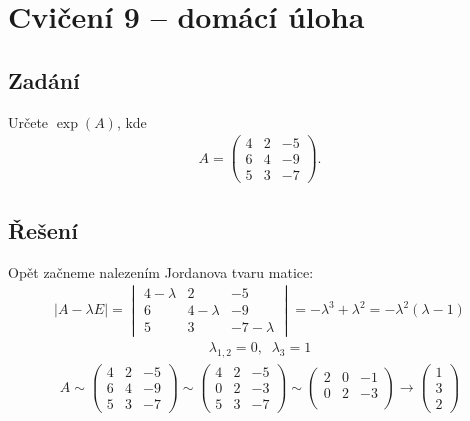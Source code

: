 \documentclass[]{article}
\begin{document}
\section{Cvičení 9 – domácí úloha}
\subsection{Zadání}
Určete $\exp(A)$, kde
\begin{align*}
    A = \begin{pmatrix}
        4 & 2 & -5 \\
        6 & 4 & -9 \\
        5 & 3 & -7
    \end{pmatrix}.
\end{align*}

\subsection{Řešení}
Opět začneme nalezením Jordanova tvaru matice:
\begin{align*}
    |A - \lambda E| = \begin{vmatrix}
        4-\lambda & 2 & -5 \\
        6 & 4-\lambda & -9 \\
        5 & 3 & -7-\lambda
    \end{vmatrix} = -\lambda^3 + \lambda^2 = -\lambda^2 (\lambda - 1)
\end{align*}
\begin{align*}
    \lambda_{1,2} = 0, \;\; \lambda_3 = 1
\end{align*}
\begin{align*}
    A \sim
    \begin{pmatrix}
        4 & 2 & -5 \\
        6 & 4 & -9 \\
        5 & 3 & -7
    \end{pmatrix}
    \sim
    \begin{pmatrix}
        4 & 2 & -5 \\
        0 & 2 & -3 \\
        5 & 3 & -7
    \end{pmatrix}
    \sim
    \begin{pmatrix}
        2 & 0 & -1 \\
        0 & 2 & -3 \\
    \end{pmatrix}
    \rightarrow
    \begin{pmatrix}
        1 \\ 3 \\ 2
    \end{pmatrix}
\end{align*}
\end{document}

